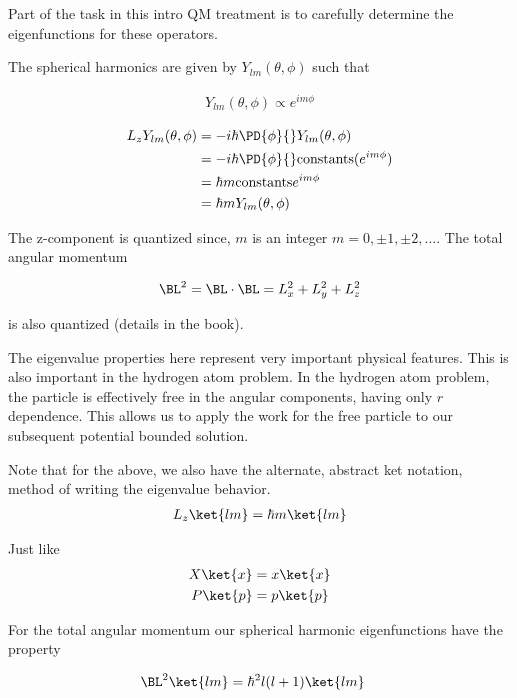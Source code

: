 Part of the task in this intro QM treatment is to carefully determine the eigenfunctions for these operators.

The spherical harmonics are given by $Y_{lm}(\theta, \phi)$ such that

\begin{align}\label{eqn:PHY356Foct19:1004}
Y_{lm}(\theta, \phi) \propto e^{i m \phi}
\end{align}

\begin{align*}
L_z Y_{lm}(\theta, \phi)
&= -i \hbar \PD{\phi}{} Y_{lm}(\theta, \phi) \\
&= -i \hbar \PD{\phi}{} \text{constants} (e^{im \phi}) \\
&= \hbar m \text{constants} e^{i m \phi} \\
&= \hbar m Y_{lm}(\theta, \phi)
\end{align*}

The z-component is quantized since, $m$ is an integer $m = 0, \pm 1, \pm 2, ...$.  The total angular momentum

\begin{align}\label{eqn:PHY356Foct19:1005}
\BL^2 = \BL \cdot \BL = L_x^2 + L_y^2 + L_z^2
\end{align}

is also quantized (details in the book).

The eigenvalue properties here represent very important physical features.  This is also important in the hydrogen atom problem.  In the hydrogen atom problem, the particle is effectively free in the angular components, having only $r$ dependence.  This allows us to apply the work for the free particle to our subsequent potential bounded solution.

Note that for the above, we also have the alternate, abstract ket notation, method of writing the eigenvalue behavior.
\begin{align}\label{eqn:PHY356Foct19:1006}
L_z \ket{lm} = \hbar m \ket{lm}
\end{align}

Just like
\begin{align}\label{eqn:PHY356Foct19:1007}
X \ket{x} &= x \ket{x} \\
P \ket{p} &= p \ket{p}
\end{align}

For the total angular momentum our spherical harmonic eigenfunctions have the property

\begin{align}\label{eqn:PHY356Foct19:1008}
\BL^2 \ket{lm} &= \hbar^2 l (l + 1)\ket{l m}
\end{align}

